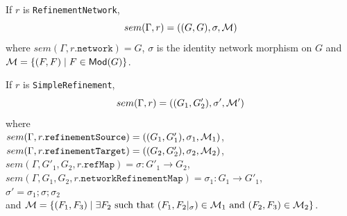 \documentclass[10pt,fleqn,final]{scrreprt}
\newcommand*{\syntax}[1]{\texttt{#1}}
\newenvironment{definitions}[0]{\medskip }{}
\begin{document}
\begin{definitions}
If $r$ is \syntax{RefinementNetwork},
$$sem(\Gamma, r) = ((G, G), \sigma, {\cal M})$$
\noindent 
where $sem(\Gamma, r.\syntax{network}) = G$,
$\sigma$ is the identity network morphism on $G$
and 
${\cal M} = \{ (F, F) \mid F \in \mathsf{Mod}(G)\}$.

%

If $r$ is \syntax{SimpleRefinement},
$$sem(\Gamma, r) = 
((G_1,G'_2),\sigma', {\cal M}')$$
where\\
 $sem(\Gamma,  r.\syntax{refinementSource}) = ((G_1,G'_1), \sigma_1,\cM_1)$,\\
 $sem(\Gamma,  r.\syntax{refinementTarget}) = ((G_2, G'_2),\sigma_2, \cM_2)$,\\ 
 $sem(\Gamma, G'_1, G_2, r.\syntax{refMap}) = \sigma:G'_1\to G_2$,\\
 $sem(\Gamma, G_1, G_2, r.\syntax{networkRefinementMap}) = \sigma_1:G_1\to G'_1$,\\
 $\sigma' = \sigma_1;\sigma;\sigma_2$ \\
 and 
 ${\cal M} = \{(F_1,F_3) \mid \exists F_2 \text{ such that } 
                         (F_1, F_2|_{\sigma}) \in {\cal M}_1       
                         \text{ and } (F_2, F_3) \in {\cal M}_2 \}$.


\end{definitions}
\end{document}
